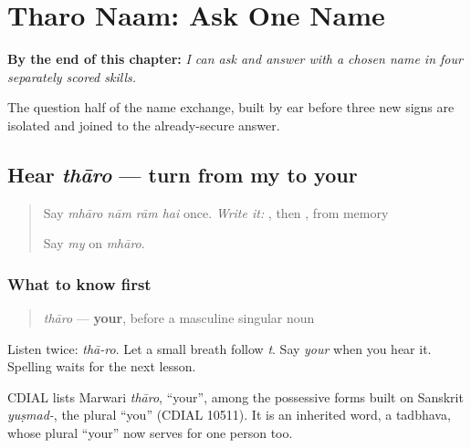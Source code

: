
\chapter{Tharo Naam: Ask One Name}
\label{ch:mw-name-question}

\begin{chapteropening}
\textbf{By the end of this chapter:} \emph{I can ask     and answer with a chosen name in four separately scored skills.}

The question half of the name exchange, built by ear before three new signs are isolated and joined to the already-secure answer.
\end{chapteropening}

\section[thāro]{Hear \emph{thāro} — turn from my to your}

\label{lesson:MW-C05-hear-tharo}



\begin{quote}
Say \emph{mhāro nām rām hai} once. \emph{Write it:} \textbf{}, then \textbf{}, from memory

Say \emph{my} on \emph{mhāro}.
\end{quote}

\subsection*{What to know first}
\begin{quote}
\emph{thāro} — \textbf{your}, before a masculine singular noun
\end{quote}

Listen twice: \emph{thā-ro}. Let a small breath follow \emph{t}. Say \emph{your} when you hear it. Spelling waits for the next lesson.

\begin{cousinweb}
CDIAL lists Marwari \emph{thāro}, \textquotedblleft{}your\textquotedblright{}, among the possessive forms built on Sanskrit \emph{yuṣmad-}, the plural \textquotedblleft{}you\textquotedblright{} (CDIAL 10511). It is an inherited word, a tadbhava, whose plural \textquotedblleft{}your\textquotedblright{} now serves for one person too.
\end{cousinweb}

